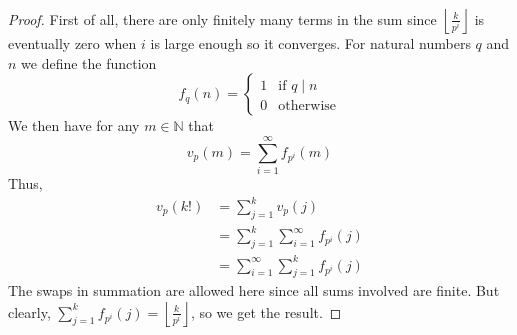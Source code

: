 \documentclass{article}
\newcommand{\mbb}[1]{\mathbb{#1}}
\numberwithin{equation}{section}
\begin{document}
\begin{proof}
    First of all, there are only finitely many terms in the sum since $\left\lfloor \frac{k}{p^i} \right \rfloor$ is eventually zero when $i$ is large enough so it converges. For natural numbers $q$ and $n$ we define the function
    $$f_q(n) = \begin{cases}
            1 & \text{if } q \mid n \\
            0 & \text{otherwise}
        \end{cases}$$
    We then have for any $m \in \mbb N$ that
    $$v_p(m) = \sum_{i = 1}^{\infty} f_{p^i}(m)$$
    Thus,
    \begin{align*}
        v_p(k!) & = \sum_{j = 1}^k v_p(j)                           \\
                & = \sum_{j = 1}^k \sum_{i = 1}^{\infty} f_{p^i}(j) \\
                & = \sum_{i = 1}^{\infty} \sum_{j = 1}^k f_{p^i}(j)
    \end{align*}
    The swaps in summation are allowed here since all sums involved are finite. But clearly, $\sum_{j = 1}^k f_{p^i}(j) = \left\lfloor \frac{k}{p^i} \right \rfloor$, so we get the result.
\end{proof}
\end{document}
